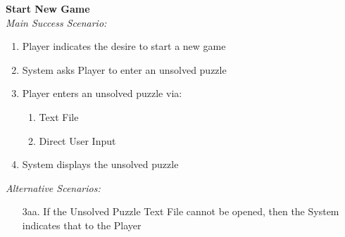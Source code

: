 \documentclass[letterpaper]{article}
\begin{document}
\noindent
\textbf{Start New Game}\\
\textit{Main Success Scenario: }
\begin{enumerate}
\item Player indicates the desire to start a new game
\item System asks Player to enter an unsolved puzzle
\item Player enters an unsolved puzzle via:
\begin{enumerate}
\item Text File
\item Direct User Input
\end{enumerate}
\item System displays the unsolved puzzle
\end{enumerate}
\textit{Alternative Scenarios:}
\begin{itemize}
\item[3aa.] If the Unsolved Puzzle Text File cannot be opened, then
the System indicates that to the Player
\end{itemize}
\end{document}
